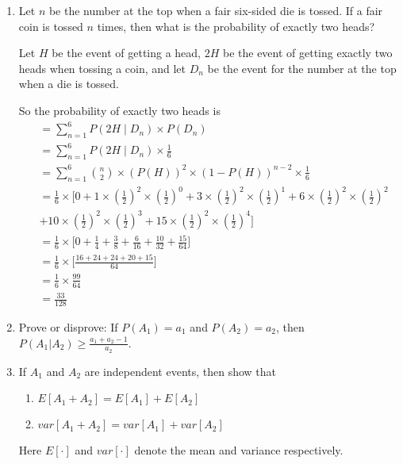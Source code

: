 \begin{enumerate}
\item \relax[3 points] Let $n$ be the number at the top when a fair
  six-sided die is tossed. If a fair coin is tossed $n$ times, then
  what is the probability of exactly two heads?

Let $H$ be the event of getting a head, $2H$ be the event of getting exactly two heads when tossing a coin, and let $D_n$ be the event for the number at the top when a die is tossed.

So the probability of exactly two heads is
\begin{equation*}
\begin{aligned}
&= \sum_{n=1}^6  P(2H \mid D_n) \times P(D_n)\\
&= \sum_{n=1}^6  P(2H \mid D_n) \times \frac{1}{6}\\
&= \sum_{n=1}^6  {n \choose 2} \times \left( P(H) \right ) ^ 2  \times \left(1- P(H) \right ) ^ {n-2} \times \frac{1}{6}\\
&= \frac{1}{6} \times \bigl [ 0 +  1 \times \left(\frac{1}{2} \right)^2 \times \left (\frac{1}{2}\right )^0 + 3 \times \left(\frac{1}{2} \right)^2 \times \left (\frac{1}{2}\right )^1 + 6 \times \left(\frac{1}{2} \right)^2 \times \left (\frac{1}{2}\right )^2 \\
&+10 \times \left(\frac{1}{2} \right)^2 \times \left (\frac{1}{2}\right )^3  + 15 \times \left(\frac{1}{2} \right)^2 \times \left (\frac{1}{2}\right )^4 \bigr ]\\
&= \frac{1}{6} \times \bigl [ 0 +  \frac{1}{4} + \frac{3}{8} + \frac{6}{16} + \frac{10}{32} + \frac{15}{64}\bigr ]\\
&= \frac{1}{6} \times \bigl [ \frac{16+24+ 24+20+15}{64}\bigr ]\\
&=\frac{1}{6} \times\frac{99}{64} \\
&=\frac{33}{128}
\end{aligned}   
\end{equation*}  
  
\item \relax[4 points] Prove or disprove: If $P(A_1) = a_1$ and
  $P(A_2) = a_2$, then $P(A_1 | A_2) \geq \frac{a_1 + a_2 -1}{a_2}$.
\item \relax[8 points] If $A_1$ and $A_2$ are independent events, then
  show that
  \begin{enumerate}
  \item $E[A_1 + A_2] = E[A_1] + E[A_2]$
  \item $var[A_1 + A_2] = var[A_1] + var[A_2]$
  \end{enumerate}

  Here $E[\cdot]$ and $var[\cdot]$ denote the mean and variance
  respectively.


\end{enumerate}


